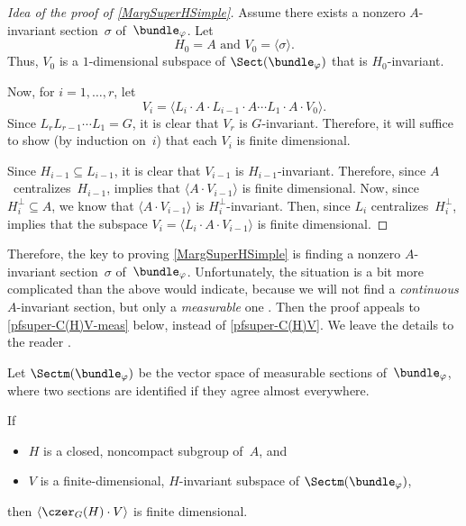 \begin{proof}[Idea of the proof of \cref{MargSuperHSimple}]
Assume there exists a nonzero $A$-invariant section~$\sigma$ of~$\bundle_\varphi$. Let 
	$$ \text{$H_0 = A$ and $V_0 = \langle \sigma \rangle$.} $$
Thus, $V_0$ is a $1$-dimensional subspace of $\Sect(\bundle_\varphi)$ that is $H_0$-invariant.

Now, for $i = 1,\ldots,r$, let
	$$ V_i = \langle L_i \cdot A \cdot L_{i-1} \cdot A \cdots L_1 \cdot A \cdot V_0 \rangle .$$
Since $L_r L_{r-1} \cdots L_1 = G$, it is clear that $V_r$ is $G$-invariant. Therefore, it will suffice to show (by induction on~$i$) that each $V_i$ is finite dimensional.

Since $H_{i-1} \subseteq L_{i-1}$, it is clear that $V_{i-1}$ is $H_{i-1}$-invariant. Therefore, since $A$~centralizes~$H_{i-1}$,  implies that $\langle A \cdot V_{i-1} \rangle$ is finite dimensional. Now, since $H_i^\perp \subseteq A$, we know that $\langle A \cdot V_{i-1} \rangle$ is $H_i^\perp$-invariant. Then, since $L_i$ centralizes~$H_i^\perp$,  implies that the subspace $V_i = \langle  L_i \cdot A \cdot V_{i-1} \rangle$ is finite dimensional.
\end{proof}

Therefore, the key to proving \cref{MargSuperHSimple} is finding a nonzero $A$-invariant section~$\sigma$ of~$\bundle_\varphi$. Unfortunately, the situation is a bit more complicated than the above would indicate, because  we will not find a \emph{continuous} $A$-invariant section, but only a \emph{measurable} one . Then the proof appeals to \cref{pfsuper-C(H)V-meas} below, instead of \cref{pfsuper-C(H)V}. We leave the details to the reader .

\begin{defn}
Let $\Sectm(\bundle_\varphi)$ be the vector space of measurable sections of~$\bundle_\varphi$, where two sections are identified if they agree almost everywhere.
\end{defn}

\begin{lem} \label{pfsuper-C(H)V-meas}
If
\noprelistbreak
	\begin{itemize}
	\item $H$ is a closed, noncompact subgroup of~$A$,
	and
	\item $V$ is a finite-dimensional, $H$-invariant subspace of\/ $\Sectm(\bundle_\varphi)$,
	\end{itemize}
then $\langle \czer_G(H) \cdot V \rangle$ is finite dimensional.
\end{lem}


